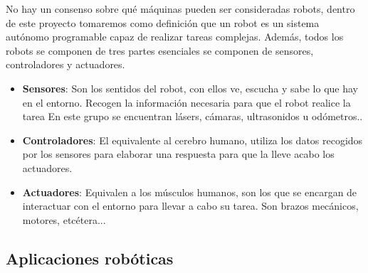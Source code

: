 No hay un consenso sobre qué máquinas pueden ser consideradas robots,
dentro de este proyecto tomaremos como definición que un robot es un sistema autónomo programable capaz de realizar tareas complejas. Además, todos los robots se componen de tres partes esenciales  se componen de sensores, controladores y actuadores.
\begin{itemize}
    \item \textbf{Sensores}: Son los sentidos del robot, con ellos ve, escucha y sabe lo que hay en el entorno. Recogen la información necesaria para que el robot realice la tarea En este grupo se encuentran lásers, cámaras, ultrasonidos u odómetros..
    \item \textbf{Controladores}: El equivalente al cerebro humano, utiliza los datos recogidos por los sensores para elaborar una respuesta para que la lleve acabo los actuadores.
    \item \textbf{Actuadores}: Equivalen a los músculos humanos, son los que se encargan de interactuar con el entorno para llevar a cabo su tarea. Son brazos mecánicos, motores, etcétera...
\end{itemize}

\subsection{Aplicaciones robóticas}


